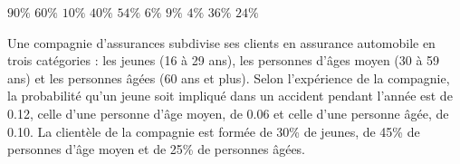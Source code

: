 \begin{questions}
\begin{parts}
\begin{checkboxes}
    \choice $90\%$
    \choice $60\%$
    \choice $10\%$
    \choice $40\%$
    \choice $54\%$
    \choice $6\%$
    \choice $9\%$
    \choice $4\%$
    \choice $36\%$
    \choice $24\%$
    
\end{checkboxes}
\end{parts}
\newpage

\question
Une compagnie d’assurances subdivise ses clients en assurance automobile en trois catégories : les jeunes (16 à 29 ans), les personnes d’âges moyen (30 à 59 ans) et les personnes âgées (60 ans et plus). Selon l’expérience de la compagnie, la probabilité qu’un jeune soit impliqué dans un accident pendant l’année est de 0.12, celle d’une personne d’âge moyen, de 0.06 et celle d’une personne âgée, de 0.10. La clientèle de la compagnie est formée de 30\% de jeunes, de 45\% de personnes d’âge moyen et de 25\% de personnes âgées. 

\end{questions}
